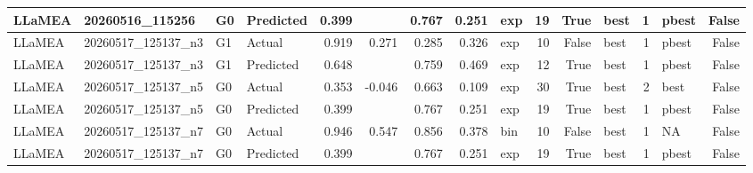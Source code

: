 \begin{table}[htbp]
\begin{tabular}{llllrrrrlrrlrlr}
LLaMEA & 20260516\_115256 & G0 & Predicted & 0.399 &  & 0.767 & 0.251 & exp & 19 & True & best & 1 & pbest & False \\
\midrule
LLaMEA & 20260517\_125137\_n3 & G1 & Actual & 0.919 & 0.271 & 0.285 & 0.326 & exp & 10 & False & best & 1 & pbest & False \\
LLaMEA & 20260517\_125137\_n3 & G1 & Predicted & 0.648 &  & 0.759 & 0.469 & exp & 12 & True & best & 1 & pbest & False \\
\midrule
LLaMEA & 20260517\_125137\_n5 & G0 & Actual & 0.353 & -0.046 & 0.663 & 0.109 & exp & 30 & True & best & 2 & best & False \\
LLaMEA & 20260517\_125137\_n5 & G0 & Predicted & 0.399 &  & 0.767 & 0.251 & exp & 19 & True & best & 1 & pbest & False \\
\midrule
LLaMEA & 20260517\_125137\_n7 & G0 & Actual & 0.946 & 0.547 & 0.856 & 0.378 & bin & 10 & False & best & 1 & NA & False \\
LLaMEA & 20260517\_125137\_n7 & G0 & Predicted & 0.399 &  & 0.767 & 0.251 & exp & 19 & True & best & 1 & pbest & False \\
\bottomrule
\end{tabular}
\end{table}